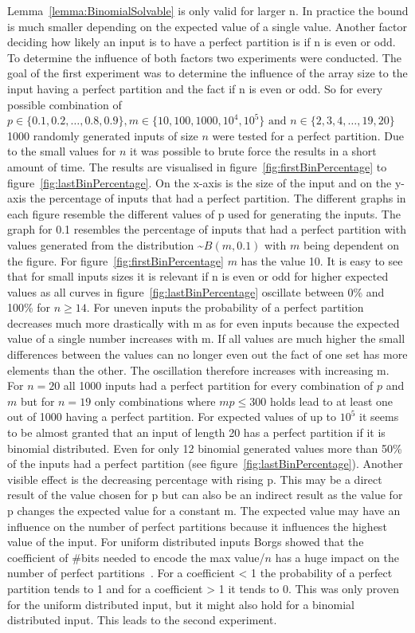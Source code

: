 Lemma~\ref{lemma:BinomialSolvable} is only valid for larger n. In practice the bound is much smaller depending on the expected value of a single value. Another factor deciding how likely an input is to have a perfect partition is if n is even or odd. To determine the influence of both factors two experiments were conducted. The goal of the first experiment was to determine the influence of the array size to the input having a perfect partition and the fact if n is even or odd. So for every possible combination of $p \in \{0.1, 0.2, \dots , 0.8, 0.9\}, m \in \{10,100,1000,10^4,10^5\} \text{ and } n \in \{2,3,4,\dots,19,20\}$ 1000 randomly generated inputs of size $n$ were tested for a perfect partition. Due to the small values for $n$ it was possible to brute force the results in a short amount of time. The results are visualised in figure~\ref{fig:firstBinPercentage} to figure~\ref{fig:lastBinPercentage}.
On the x-axis is the size of the input and on the y-axis the percentage of inputs that had a perfect partition. The different graphs in each figure resemble the different values of p used for generating the inputs. The graph for 0.1 resembles the percentage of inputs that had a perfect partition with values generated from the distribution \textasciitilde$B(m,0.1)$ with $m$ being dependent on the figure. For figure~\ref{fig:firstBinPercentage} $m$ has the value 10.\newline
It is easy to see that for small inputs sizes it is relevant if n is even or odd for higher expected values as all curves in figure~\ref{fig:lastBinPercentage} oscillate between 0\% and 100\% for $n\ge14$. For uneven inputs the probability of a perfect partition decreases much more drastically with m as for even inputs because the expected value of a single number increases with m. If all values are much higher the small differences between the values can no longer even out the fact of one set has more elements than the other. The oscillation therefore increases with increasing m. For $n=20$ all 1000 inputs had a perfect partition for every combination of $p$ and $m$ but for $n=19$ only combinations where $mp\le300$ holds lead to at least one out of 1000 having a perfect partition. For expected values of up to $10^5$ it seems to be almost granted that an input of length 20 has a perfect partition if it is binomial distributed.
Even for only 12 binomial generated values more than 50\% of the inputs had a perfect partition (see figure~\ref{fig:lastBinPercentage}). Another visible effect is the decreasing percentage with rising p. This may be a direct result of the value chosen for p but can also be an indirect result as the value for p changes the expected value for a constant m. The expected value may have an influence on the number of perfect partitions because it influences the highest value of the input.
For uniform distributed inputs Borgs showed that the coefficient of \#bits needed to encode the max value/$n$ has a huge impact on the number of perfect partitions~\cite{borgs2001phase}. For a coefficient < 1 the probability of a perfect partition tends to 1 and for a coefficient > 1 it tends to 0. This was only proven for the uniform distributed input, but it might also hold for a binomial distributed input. This leads to the second experiment.

